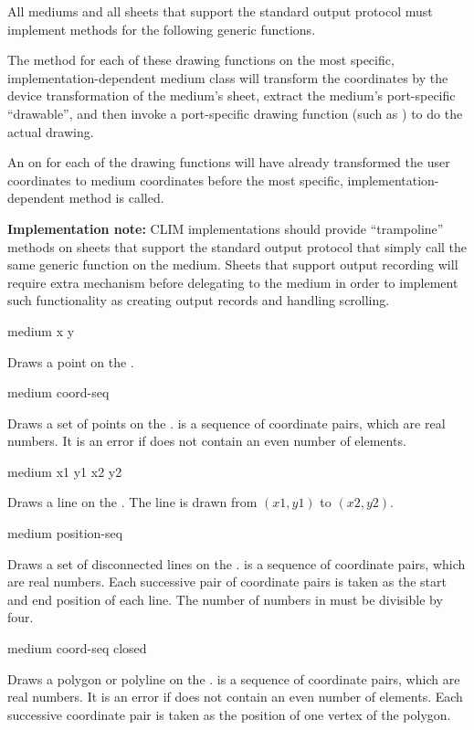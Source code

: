 All mediums and all sheets that support the standard output protocol must
implement methods for the following generic functions.

The method for each of these drawing functions on the most specific,
implementation-dependent medium class will transform the coordinates by the
device transformation of the medium's sheet, extract the medium's port-specific
``drawable'', and then invoke a port-specific drawing function (such as
) to do the actual drawing.

An  on  for each of the drawing functions will have
already transformed the user coordinates to medium coordinates before the most
specific, implementation-dependent method is called.

{\bf Implementation note:} CLIM implementations should provide ``trampoline''
methods on sheets that support the standard output protocol that simply call the
same generic function on the medium.  Sheets that support output recording will
require extra mechanism before delegating to the medium in order to implement
such functionality as creating output records and handling scrolling.

 {medium x y}

Draws a point on the  .

 {medium coord-seq}

Draws a set of points on the  .   is a
sequence of coordinate pairs, which are real numbers.  It is an error if
 does not contain an even number of elements.

 {medium x1 y1 x2 y2}

Draws a line on the  .  The line is drawn from
$(x1,y1)$ to $(x2,y2)$.

 {medium position-seq}

Draws a set of disconnected lines on the  .
 is a sequence of coordinate pairs, which are real numbers.  Each
successive pair of coordinate pairs is taken as the start and end position of
each line. The number of numbers in  must be divisible by four.

 {medium coord-seq closed}

Draws a polygon or polyline on the  .  
is a sequence of coordinate pairs, which are real numbers.  It is an error if
 does not contain an even number of elements.  Each successive
coordinate pair is taken as the position of one vertex of the polygon.


